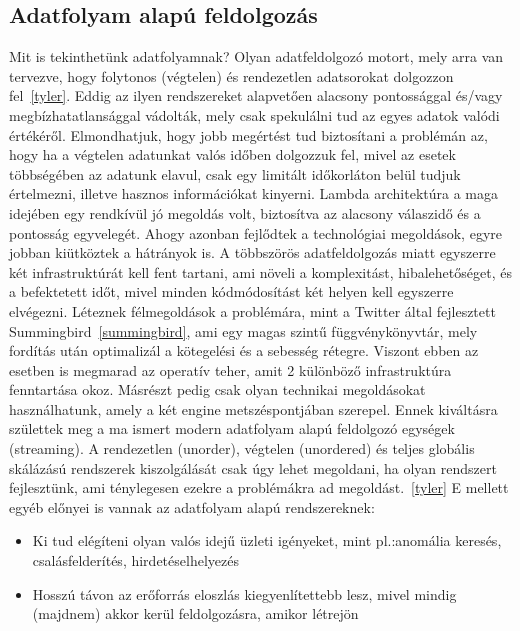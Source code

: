 \documentclass[a4paper,12pt]{article}
\begin{document}
\subsection{Adatfolyam alapú feldolgozás}
Mit is tekinthetünk adatfolyamnak? Olyan adatfeldolgozó motort, mely arra van tervezve, hogy folytonos (végtelen) és rendezetlen adatsorokat dolgozzon fel~\ref{tyler}. Eddig az ilyen rendszereket alapvetően alacsony pontossággal és/vagy megbízhatatlansággal vádolták, mely csak spekulálni tud az egyes adatok valódi értékéről. Elmondhatjuk, hogy jobb megértést tud biztosítani a problémán az, hogy ha a végtelen adatunkat valós időben dolgozzuk fel, mivel az esetek többségében az adatunk elavul, csak egy limitált időkorláton belül tudjuk értelmezni, illetve hasznos információkat kinyerni. \linebreak
Lambda architektúra a maga idejében egy rendkívül jó megoldás volt, biztosítva az alacsony válaszidő és a pontosság egyvelegét. Ahogy azonban fejlődtek a technológiai megoldások, egyre jobban kiütköztek a hátrányok is. A többszörös adatfeldolgozás miatt egyszerre két infrastruktúrát kell fent tartani, ami növeli a komplexitást, hibalehetőséget, és a befektetett időt, mivel minden kódmódosítást két helyen kell egyszerre elvégezni. Léteznek félmegoldások a problémára, mint a Twitter által fejlesztett Summingbird~\ref{summingbird}, ami egy magas szintű függvénykönyvtár, mely fordítás után optimalizál a kötegelési és a sebesség rétegre. Viszont ebben az esetben is megmarad az operatív teher, amit 2 különböző infrastruktúra fenntartása okoz. Másrészt pedig csak olyan technikai megoldásokat használhatunk, amely a két engine metszéspontjában szerepel. \linebreak
Ennek kiváltásra születtek meg a ma ismert modern adatfolyam alapú feldolgozó egységek (streaming). A rendezetlen (unorder), végtelen (unordered) és teljes globális skálázású rendszerek kiszolgálását csak úgy lehet megoldani, ha olyan rendszert fejlesztünk, ami ténylegesen ezekre a problémákra ad megoldást.~\ref{tyler} E mellett egyéb előnyei is vannak az adatfolyam alapú rendszereknek: 
\begin{itemize}
\item Ki tud elégíteni olyan valós idejű üzleti igényeket, mint pl.:anomália keresés, csalásfelderítés, hirdetéselhelyezés
\item Hosszú távon az erőforrás eloszlás kiegyenlítettebb lesz, mivel mindig (majdnem) akkor kerül feldolgozásra, amikor létrejön
\end{itemize}
\end{document}
